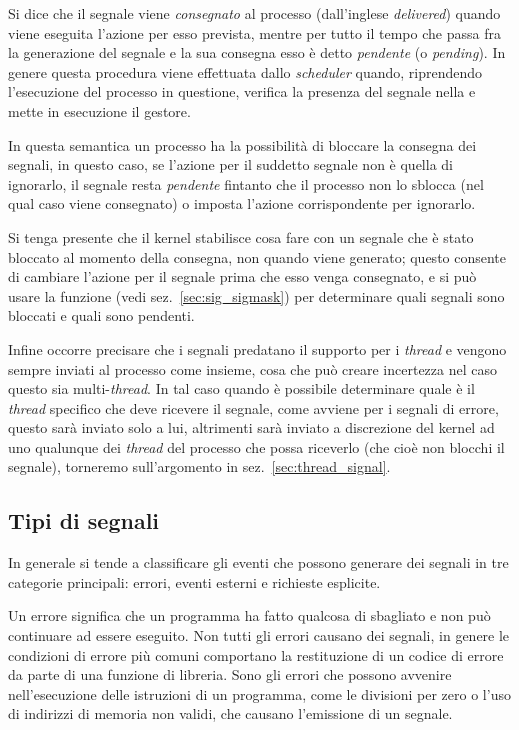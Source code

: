 Si dice che il segnale viene \textsl{consegnato} al processo (dall'inglese
\textit{delivered}) quando viene eseguita l'azione per esso prevista, mentre
per tutto il tempo che passa fra la generazione del segnale e la sua consegna
esso è detto \textsl{pendente} (o \textit{pending}). In genere questa
procedura viene effettuata dallo \textit{scheduler} quando, riprendendo
l'esecuzione del processo in questione, verifica la presenza del segnale nella
 e mette in esecuzione il gestore.

In questa semantica un processo ha la possibilità di bloccare la consegna dei
segnali, in questo caso, se l'azione per il suddetto segnale non è quella di
ignorarlo, il segnale resta \textsl{pendente} fintanto che il processo non lo
sblocca (nel qual caso viene consegnato) o imposta l'azione corrispondente per
ignorarlo.

Si tenga presente che il kernel stabilisce cosa fare con un segnale che è
stato bloccato al momento della consegna, non quando viene generato; questo
consente di cambiare l'azione per il segnale prima che esso venga consegnato,
e si può usare la funzione  (vedi sez.~\ref{sec:sig_sigmask})
per determinare quali segnali sono bloccati e quali sono pendenti.

Infine occorre precisare che i segnali predatano il supporto per i
\textit{thread} e vengono sempre inviati al processo come insieme, cosa che
può creare incertezza nel caso questo sia multi-\textit{thread}. In tal caso
quando è possibile determinare quale è il \textit{thread} specifico che deve
ricevere il segnale, come avviene per i segnali di errore, questo sarà inviato
solo a lui, altrimenti sarà inviato a discrezione del kernel ad uno qualunque
dei \textit{thread} del processo che possa riceverlo (che cioè non blocchi il
segnale), torneremo sull'argomento in sez.~\ref{sec:thread_signal}.

\subsection{Tipi di segnali}
\label{sec:sig_types}

In generale si tende a classificare gli eventi che possono generare dei
segnali in tre categorie principali: errori, eventi esterni e richieste
esplicite.

Un errore significa che un programma ha fatto qualcosa di sbagliato e non può
continuare ad essere eseguito. Non tutti gli errori causano dei segnali, in
genere le condizioni di errore più comuni comportano la restituzione di un
codice di errore da parte di una funzione di libreria. Sono gli errori che
possono avvenire nell'esecuzione delle istruzioni di un programma, come le
divisioni per zero o l'uso di indirizzi di memoria non validi, che causano
l'emissione di un segnale.

